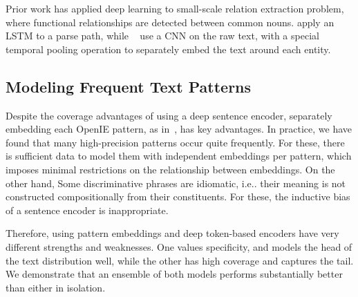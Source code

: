 Prior work has applied deep learning to small-scale relation extraction problem, where functional relationships are detected between common nouns. \citet{xu2015classifying} apply an LSTM to a parse path, while ~\citet{zengdistant} use a CNN on the raw text, with a special temporal pooling operation to separately embed the text around each entity.

\subsection{Modeling Frequent Text Patterns}
\label{sec:non-comp}

Despite the coverage advantages of using a deep sentence encoder, separately embedding each OpenIE pattern, as in~\citet{limin}, has key advantages. In practice, we have found that many high-precision patterns occur quite frequently. For these, there is sufficient data to model them with independent embeddings per pattern, which imposes minimal restrictions on the relationship between embeddings. On the other hand, Some discriminative phrases are idiomatic, i.e.. their meaning is not constructed compositionally from their constituents. For these, the inductive bias of a sentence encoder is inappropriate. 

Therefore, using pattern embeddings and deep token-based encoders have very different strengths and weaknesses. One values specificity, and models the head of the text distribution well, while the other has high coverage and captures the tail. We demonstrate that an ensemble of both models performs substantially better than either in isolation.



